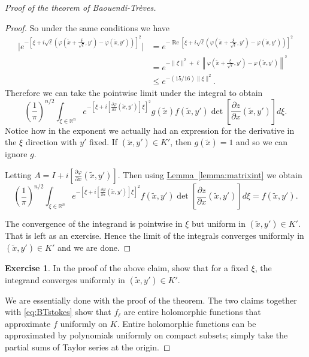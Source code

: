 \documentclass[12pt,openany]{book}
\renewcommand{\Re}{\operatorname{Re}}
\newcommand{\snorm}[1]{\lVert {#1} \rVert}
\newcommand{\bbabs}[1]{\biggl\lvert {#1} \biggr\rvert}
\newcommand{\norm}[1]{\left\lVert {#1} \right\rVert}
\newcommand{\R}{{\mathbb{R}}}
\theoremstyle{plain}
\theoremstyle{remark}
\theoremstyle{definition}
\newenvironment{exbox}{%
    \def\FrameCommand{\vrule width 1pt \relax\hspace {10pt}}%
    \MakeFramed {\advance \hsize -\width \FrameRestore }%
}{%
    \endMakeFramed
}
\theoremstyle{exercise}
\newtheorem{exercise}{Exercise}[section]
\theoremstyle{example}
\newcommand{\lemmaref}[1]{\hyperref[#1]{Lemma~\ref*{#1}}}
\begin{document}
\begin{proof}[Proof of the theorem of Baouendi-Tr{\`e}ves]
\begin{proof}
So under the same conditions we have
\begin{equation*}
\begin{split}
\bbabs{e^{-{\left[\xi +
i\sqrt{\ell}\left(\varphi\left(\tilde{x}+\frac{\xi}{\sqrt{\ell}},y'\right) -
\varphi(\tilde{x},y')\right)\right]}^2}}
& =
e^{-\Re {\left[\xi +
i\sqrt{\ell}\left(\varphi\left(\tilde{x}+\frac{\xi}{\sqrt{\ell}},y'\right) -
\varphi(\tilde{x},y')\right)\right]}^2}
\\
& =
e^{-\snorm{\xi}^2 + \ell
\norm{\varphi\left(\tilde{x}+\frac{\xi}{\sqrt{\ell}},y'\right) -
\varphi(\tilde{x},y')}^2}
\\
& \leq
e^{-(15/16)\snorm{\xi}^2} .
\end{split}
\end{equation*}
Therefore we can take the pointwise limit under the integral to obtain 
\begin{equation*}
{\left(\frac{1}{\pi}\right)}^{n/2}
\int_{\xi \in \R^n}
e^{-{\left[\xi + i\left[ \frac{\partial \varphi}{\partial x}(\tilde{x},y') \right] \xi \right]}^2}
g(\tilde{x})
f(\tilde{x},y')
\det \left[\frac{\partial z}{\partial
x}(\tilde{x},y')\right] d\xi .
\end{equation*}
Notice how in the exponent we actually had an expression for the derivative
in the $\xi$ direction with $y'$ fixed.  If $(\tilde{x},y') \in K'$, then
$g(\tilde{x}) = 1$ and so we can ignore $g$.

Letting $A = I + i \left[ \frac{\partial \varphi}{\partial x}(\tilde{x},y')
\right]$.  Then using \lemmaref{lemma:matrixint} we obtain 
\begin{equation*}
{\left(\frac{1}{\pi}\right)}^{n/2}
\int_{\xi \in \R^n}
e^{-{\left[\xi + i\left[ \frac{\partial \varphi}{\partial x}(\tilde{x},y') \right] \xi \right]}^2}
f(\tilde{x},y')
\det \left[\frac{\partial z}{\partial
x}(\tilde{x},y')\right] d\xi  = f(\tilde{x},y') .
\end{equation*}

The convergence of the integrand is pointwise in $\xi$
but uniform in $(\tilde{x},y') \in K'$.  That is left as an exercise.
Hence the limit of the integrals converges uniformly in 
$(\tilde{x},y') \in K'$ and we are done.
\end{proof}

\begin{exbox}
\begin{exercise}
In the proof of the above claim,
show that for a fixed $\xi$, the integrand converges uniformly in
$(\tilde{x},y') \in K'$.
\end{exercise}
\end{exbox}

We are essentially done with the proof of the theorem.
The two claims together with \eqref{eq:BTstokes} show that $f_\ell$ are entire
holomorphic functions that approximate $f$ uniformly on $K$.  Entire holomorphic
functions can be approximated by polynomials uniformly on compact subsets;
simply take the partial sums of Taylor series at the origin.
\end{proof}
\end{document}
